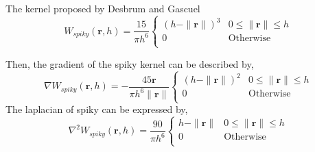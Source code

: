     The kernel proposed by Desbrum and Gascuel\cite{desbrun1996smoothed}
    \begin{equation}
        W_{spiky}(\textbf{r}, h) = \frac{15}{\pi h^6}
            \begin{cases}
                (h - \|\textbf{r}\|)^3 & 0\le\|\textbf{r}\|\le h \\
                0 & \textrm{Otherwise}\\
            \end{cases}
    \end{equation}

    Then, the gradient of the spiky kernel can be described by,
    \begin{equation}
        \nabla W_{spiky}(\textbf{r}, h) = -\frac{45 \textbf{r}}{\pi h^6 \|\textbf{r}\|}
            \begin{cases}
                (h - \|\textbf{r}\|)^2 & 0\le\|\textbf{r}\|\le h \\
                0 & \textrm{Otherwise}\\
            \end{cases}
    \end{equation}
     The laplacian of spiky can be expressed by,
     \begin{equation}
        \nabla^2 W_{spiky}(\textbf{r}, h) = \frac{90}{\pi h^6}
            \begin{cases}
                h - \| \textbf{r} \| & 0 \le \| \textbf{r} \| \le h \\
                0 & \textrm{Otherwise}\\
            \end{cases}
    \end{equation}

